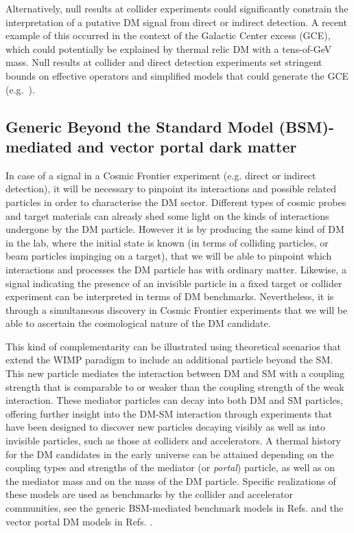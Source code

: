 \documentclass[nofootinbib]{article}
\begin{document}
Alternatively, null results at collider experiments could significantly constrain the interpretation of a putative DM signal from direct or indirect detection. A recent example of this occurred in the context of the Galactic Center excess (GCE), which could potentially be explained by thermal relic DM with a tens-of-GeV mass. 
Null results at collider and direct detection experiments set stringent bounds on effective operators and simplified models that could generate the GCE (e.g.~\cite{Alves:2014yha,Berlin:2014tja,Dolan:2014ska,Abdullah:2014lla,Agrawal:2014una}).

\FloatBarrier

\subsection{Generic Beyond the Standard Model (BSM)-mediated and vector portal dark matter}
\label{sub:BSMMediation}

In case of a signal in a Cosmic Frontier experiment (e.g. direct or indirect detection), it will be necessary to pinpoint its interactions and possible related particles in order to characterise the DM sector. 
Different types of cosmic probes and target materials can already shed some light on the kinds of interactions undergone by the DM particle. 
However it is by producing the same kind of DM in the lab, where the initial state is known (in terms of colliding particles, or beam particles impinging on a target), that we will be able to pinpoint which interactions and processes the DM particle has with ordinary matter. 
Likewise, a signal indicating the presence of an invisible particle in a fixed target or collider experiment can  be interpreted in terms of DM benchmarks.
Nevertheless, it is through a simultaneous discovery in Cosmic Frontier experiments that we will be able to ascertain the cosmological nature of the DM candidate. 

This kind of complementarity can be illustrated using theoretical scenarios that extend the WIMP paradigm to include an additional particle beyond the SM.
This new particle mediates the interaction between DM and SM with a coupling strength that is comparable to or weaker than the coupling strength of the weak interaction.
These mediator particles can decay into both DM and SM particles, offering further insight into the DM-SM interaction through experiments that have been designed to discover new particles decaying visibly as well as into invisible particles, such as those at colliders and accelerators.  
A thermal history for the DM candidates in the early universe can be attained depending on the coupling types and strengths of the mediator (or \textit{portal}) particle, as well as on the mediator mass and on the mass of the DM particle. 
Specific realizations of these models are used as benchmarks by the collider and accelerator communities, see the generic BSM-mediated benchmark models in Refs. \cite{Abercrombie:2015wmb,Energy-Frontier-Report} and the vector portal DM models in Refs. \cite{Beacham:2019nyx,Gori:2022vri}. 
\end{document}
